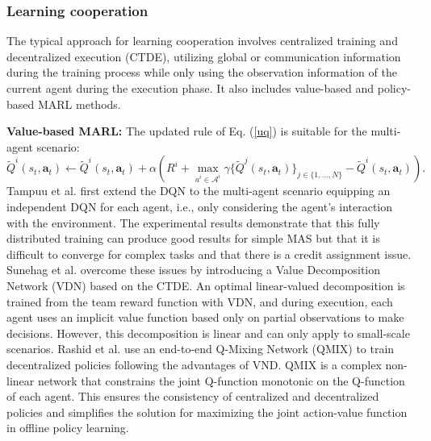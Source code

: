 \documentclass[acmsmall]{acmart}
\begin{document}
\subsubsection{Learning cooperation}
The typical approach for learning cooperation involves centralized training and decentralized execution (CTDE), utilizing global or communication information during the training process while only using the observation information of the current agent during the execution phase. It also includes value-based \cite{iql, vdn, qmix, qtran, qplex} and policy-based \cite{maddpg,Liu_Wang_Hu_Hao_Chen_Gao_2020,Ryu_Shin_Park_2020,NEURIPS2021_65b9eea6} MARL methods. 

\textbf{Value-based MARL: }
The updated rule of Eq. (\ref{uq}) is suitable for the multi-agent scenario:
\begin{equation}\label{maq}
    \tilde Q^i\left(s_t, \bm a_t \right) \leftarrow \tilde {Q}^i\left(s_t, \bm a_t \right)+\alpha \left(R^i+\mathop{max}\limits_{a^i\in\mathcal A^i} \gamma\{\tilde Q^j\left(s_t, \bm a_t\right)\}_{j\in\{1,\dots,N\}}-\tilde Q^i\left(s_t,\bm a_t\right)\right).
\end{equation}
Tampuu et al. \cite{iql} first extend the DQN to the multi-agent scenario equipping an independent DQN for each agent, i.e., only considering the agent's interaction with the environment.  The experimental results demonstrate that this fully distributed training can produce good results for simple MAS but that it is difficult to converge for complex tasks and that there is a credit assignment issue. 
Sunehag et al. \cite{vdn} overcome these issues by introducing a Value Decomposition Network (VDN) based on the CTDE. An optimal linear-valued decomposition is trained from the team reward function with VDN, and during execution, each agent uses an implicit value function based only on partial observations to make decisions. However, this decomposition is linear and can only apply to small-scale scenarios. 
Rashid et al. \cite{qmix} use an end-to-end Q-Mixing Network (QMIX) to train decentralized policies following the advantages of VND. QMIX is a complex non-linear network that constrains the joint Q-function monotonic on the Q-function of each agent. This ensures the consistency of centralized and decentralized policies and simplifies the solution for maximizing the joint action-value function in offline policy learning.
\end{document}

